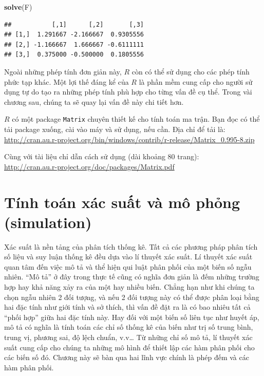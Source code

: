 \documentclass[
]{book}
\newenvironment{Shaded}{\begin{snugshade}}{\end{snugshade}}
\newcommand{\KeywordTok}[1]{\textcolor[rgb]{0.13,0.29,0.53}{\textbf{#1}}}
\newcommand{\NormalTok}[1]{#1}
\begin{document}
\begin{Shaded}
\begin{Highlighting}[]
\KeywordTok{solve}\NormalTok{(F)}
\end{Highlighting}
\end{Shaded}

\begin{verbatim}
##           [,1]      [,2]       [,3]
## [1,]  1.291667 -2.166667  0.9305556
## [2,] -1.166667  1.666667 -0.6111111
## [3,]  0.375000 -0.500000  0.1805556
\end{verbatim}

Ngoài những phép tính đơn giản này, \(R\) còn có thể sử dụng cho các phép tính phức tạp khác. Một lợi thế đáng kể của \(R\) là phần mềm cung cấp cho người sử dụng tự do tạo ra những phép tính phù hợp cho từng vấn đề cụ thể. Trong vài chương sau, chúng ta sẽ quay lại vấn đề này chi tiết hơn.

\(R\) có một package \texttt{Matrix} chuyên thiết kế cho tính toán ma trận. Bạn đọc có thể tải package xuống, cài vào máy và sử dụng, nếu cần. Địa chỉ để tải là:\\
\url{http://cran.au.r-project.org/bin/windows/contrib/r-release/Matrix_0.995-8.zip}

Cùng với tài liệu chỉ dẫn cách sử dụng (dài khoảng 80 trang):\\
\url{http://cran.au.r-project.org/doc/packages/Matrix.pdf}

\hypertarget{Tinh-toan-xac-suat-va-mo-phong-simulation}{%
\chapter{Tính toán xác suất và mô phỏng (simulation)}\label{Tinh-toan-xac-suat-va-mo-phong-simulation}}

Xác suất là nền tảng của phân tích thống kê. Tất cả các phương pháp phân tích số liệu và suy luận thống kê đều dựa vào lí thuyết xác suất. Lí thuyết xác suất quan tâm đến việc mô tả và thể hiện qui luật phân phối của một biến số ngẫu nhiên. ``Mô tả'' ở đây trong thực tế cũng có nghĩa đơn giản là đếm những trường hợp hay khả năng xảy ra của một hay nhiều biến. Chẳng hạn như khi chúng ta chọn ngẫu nhiên 2 đối tượng, và nếu 2 đối tượng này có thể được phân loại bằng hai đặc tính như giới tính và sở thích, thì vấn đề đặt ra là có bao nhiêu tất cả ``phối hợp'' giữa hai đặc tính này. Hay đối với một biến số liên tục như huyết áp, mô tả có nghĩa là tính toán các chỉ số thống kê của biến như trị số trung bình, trung vị, phương sai, độ lệch chuẩn, v.v\ldots{} Từ những chỉ số mô tả, lí thuyết xác suất cung cấp cho chúng ta những mô hình để thiết lập các hàm phân phối cho các biến số đó. Chương này sẽ bàn qua hai lĩnh vực chính là phép đếm và các hàm phân phối.
\end{document}
